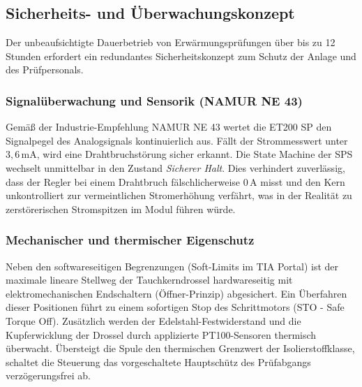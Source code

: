 \subsection{Sicherheits- und Überwachungskonzept}
\label{sec:sicherheitskonzept}

Der unbeaufsichtigte Dauerbetrieb von Erwärmungsprüfungen über bis zu 12 Stunden erfordert ein redundantes Sicherheitskonzept zum Schutz der Anlage und des Prüfpersonals.
\subsubsection{Signalüberwachung und Sensorik (NAMUR NE 43)}
Gemäß der Industrie-Empfehlung NAMUR NE 43 wertet die ET200 SP den Signalpegel des Analogsignals kontinuierlich aus. Fällt der Strommesswert unter $3,6\,\text{mA}$, wird eine Drahtbruchstörung sicher erkannt. Die State Machine der SPS wechselt unmittelbar in den Zustand \textit{Sicherer Halt}. Dies verhindert zuverlässig, dass der Regler bei einem Drahtbruch fälschlicherweise $0\,\text{A}$ misst und den Kern unkontrolliert zur vermeintlichen Stromerhöhung verfährt, was in der Realität zu zerstörerischen Stromspitzen im Modul führen würde.
\subsubsection{Mechanischer und thermischer Eigenschutz}
Neben den softwareseitigen Begrenzungen (Soft-Limits im TIA Portal) ist der maximale lineare Stellweg der Tauchkerndrossel hardwareseitig mit elektromechanischen Endschaltern (Öffner-Prinzip) abgesichert. Ein Überfahren dieser Positionen führt zu einem sofortigen Stop des Schrittmotors (STO - Safe Torque Off).
Zusätzlich werden der Edelstahl-Festwiderstand und die Kupferwicklung der Drossel durch applizierte PT100-Sensoren thermisch überwacht. Übersteigt die Spule den thermischen Grenzwert der Isolierstoffklasse, schaltet die Steuerung das vorgeschaltete Hauptschütz des Prüfabgangs verzögerungsfrei ab.




